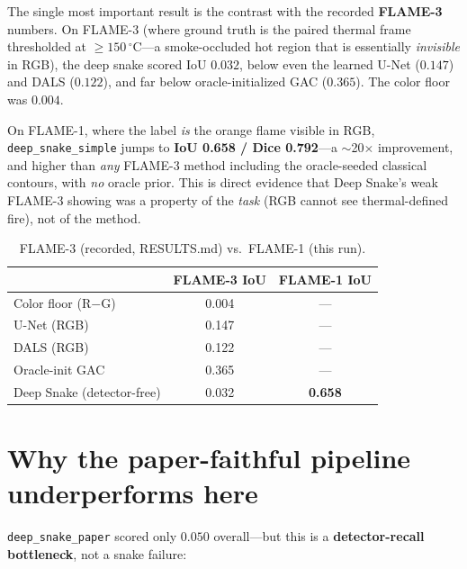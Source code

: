 \documentclass[10pt]{article}
\begin{document}
The single most important result is the contrast with the recorded \textbf{FLAME-3}
numbers. On FLAME-3 (where ground truth is the paired thermal frame thresholded at
$\ge150\,^\circ$C---a smoke-occluded hot region that is essentially \emph{invisible}
in RGB), the deep snake scored IoU $0.032$, below even the learned U-Net ($0.147$)
and DALS ($0.122$), and far below oracle-initialized GAC ($0.365$). The color floor
was $0.004$.

On FLAME-1, where the label \emph{is} the orange flame visible in RGB,
\texttt{deep\_snake\_simple} jumps to \textbf{IoU 0.658 / Dice 0.792}---a
$\sim$20$\times$ improvement, and higher than \emph{any} FLAME-3 method including the
oracle-seeded classical contours, with \emph{no} oracle prior. This is direct
evidence that Deep Snake's weak FLAME-3 showing was a property of the
\emph{task} (RGB cannot see thermal-defined fire), not of the method.

\begin{table}[H]
\centering
\caption{FLAME-3 (recorded, RESULTS.md) vs.\ FLAME-1 (this run).}
\begin{tabular}{lcc}
\toprule
 & FLAME-3 IoU & FLAME-1 IoU \\
\midrule
Color floor (R$-$G)            & 0.004 & --- \\
U-Net (RGB)                    & 0.147 & --- \\
DALS (RGB)                     & 0.122 & --- \\
Oracle-init GAC                & 0.365 & --- \\
Deep Snake (detector-free)     & 0.032 & \textbf{0.658} \\
\bottomrule
\end{tabular}
\end{table}

\section{Why the paper-faithful pipeline underperforms here}

\texttt{deep\_snake\_paper} scored only $0.050$ overall---but this is a
\textbf{detector-recall bottleneck}, not a snake failure:
\end{document}

